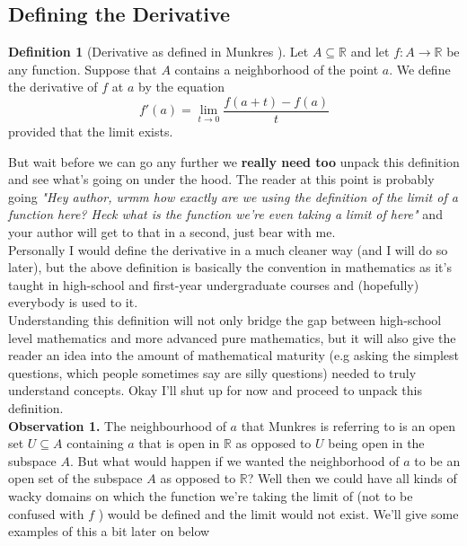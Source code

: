\documentclass[12pt]{article}
\theoremstyle{definition}
\newtheorem{definition}{Definition}[section]
\numberwithin{theorem}{subsection}
\numberwithin{corollary}{subsection}
\theoremstyle{remark}
\theoremstyle{point}
\begin{document}
	\subsection{Defining the Derivative}
	
	
	\begin{definition}[Derivative as defined in Munkres \cite{munkres2018analysis}]
		Let $A \subseteq \mathbb{R}$ and let $f : A \to \mathbb{R}$ be any function. Suppose that $A$ contains a neighborhood of the point $a$. We define the derivative of $f$ at $a$ by the equation $$f'(a) = \lim_{t \to 0} \frac{f(a+t) - f(a)}{t}$$ provided that the limit exists.
	\end{definition}
	
	But wait before we can go any further we \textbf{really need too} unpack this definition and see what's going on under the hood. The reader at this point is probably going \textit{"Hey author, urmm how exactly are we using the definition of the limit of a function here? Heck what is the function we're even taking a limit of here"} and your author will get to that in a second, just bear with me. \\
		
	Personally I would define the derivative in a much cleaner way (and I will do so later), but the above definition is basically the convention in mathematics as it's taught in high-school and first-year undergraduate courses and (hopefully) everybody is used to it. \\
		
	Understanding this definition will not only bridge the gap between high-school level mathematics and more advanced pure mathematics, but it will also give the reader an idea into the amount of mathematical maturity (e.g asking the simplest questions, which people sometimes say are silly questions) needed to truly understand concepts. Okay I'll shut up for now and proceed to unpack this definition. \\
	
	\textbf{Observation 1.}  The neighbourhood of $a$ that Munkres is referring to is an open set $U \subseteq A$  containing $a$ that is open in $\mathbb{R}$ as opposed to $U$ being open in the subspace $A$. But what would happen if we wanted the neighborhood of $a$ to be an open set of the subspace $A$ as opposed to $\mathbb{R}$? Well then we could have all kinds of wacky domains on which the function  we're taking the limit of (not to be confused with $f$ ) would be defined and the limit would not exist. We'll give some examples of this a bit later on below \\
	
\end{document}
